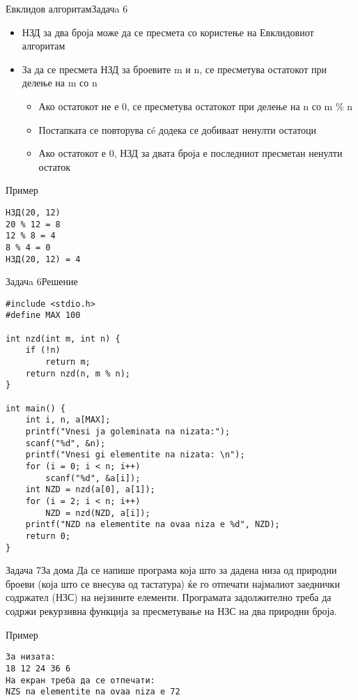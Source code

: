 \begin{frame}[fragile,shrink=5]{Евклидов алгоритам}{Задачa 6}
\begin{itemize}
  \item НЗД за два броја може да се пресмета со користење на Евклидовиот
  алгоритам
  \item За да се пресмета НЗД за броевите m и n, се пресметува остатокот при
  делење на m со n
  \begin{itemize}
  \item Ако остатокот не е 0, се пресметува остатокот при делење на n со m \% n
  \item Постапката се повторува сé додека се добиваат ненулти остатоци
  \item Ако остатокот е 0, НЗД за двата броја е последниот пресметан ненулти
  остаток
  \end{itemize}
\end{itemize}
\begin{exampleblock}{Пример}
\begin{verbatim}
НЗД(20, 12)
20 % 12 = 8
12 % 8 = 4
8 % 4 = 0
НЗД(20, 12) = 4
\end{verbatim}
\end{exampleblock}
\end{frame}

\begin{frame}[fragile]{Задачa 6}{Решение}
\begin{lstlisting}
#include <stdio.h>
#define MAX 100

int nzd(int m, int n) {
    if (!n)
        return m;
    return nzd(n, m % n);
}

int main() {
    int i, n, a[MAX];
    printf("Vnesi ja goleminata na nizata:");
    scanf("%d", &n);
    printf("Vnesi gi elementite na nizata: \n");
    for (i = 0; i < n; i++)
        scanf("%d", &a[i]);
    int NZD = nzd(a[0], a[1]);
    for (i = 2; i < n; i++)
        NZD = nzd(NZD, a[i]);
    printf("NZD na elementite na ovaa niza e %d", NZD);
    return 0;
}
\end{lstlisting}
\end{frame}

\begin{frame}[fragile]{Задача 7}{За дома}
Да се напише програма која што за дадена низа од природни броеви (која што се
внесува од тастатура) ќе го отпечати најмалиот заеднички содржател (НЗС) на
нејзините елементи.  Програмата задолжително треба да содржи рекурзивна функција
за пресметување на НЗС на два природни броја.
\begin{exampleblock}{Пример}
\begin{verbatim}
За низата:
18 12 24 36 6
На екран треба да се отпечати:
NZS na elementite na ovaa niza e 72
\end{verbatim}
\end{exampleblock}
\end{frame}
   

